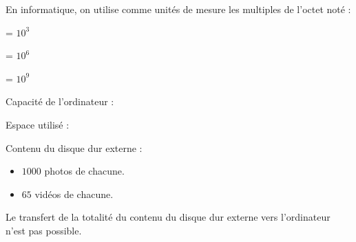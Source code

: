\begin{exercice*}
    En informatique, on utilise comme unités de mesure les multiples de l'octet noté \Octet[o]{} :
    
    \begin{minipage}{0.24\textwidth}
         = $10^3$ \Octet[o]{}

         = $10^6$ \Octet[o]{}

         = $10^9$ \Octet[o]{}
    \end{minipage}
    \begin{minipage}{0.24\textwidth}
        Capacité de l'ordinateur : 

        Espace utilisé :         
    \end{minipage}

    Contenu du disque dur externe :
    \begin{itemize}
        \item $\num{1000}$ photos de  chacune.
        \item $65$ vidéos de  chacune.
    \end{itemize}

    Le transfert de la totalité du contenu du disque dur externe
    vers l'ordinateur n'est pas possible.
\end{exercice*}
 

